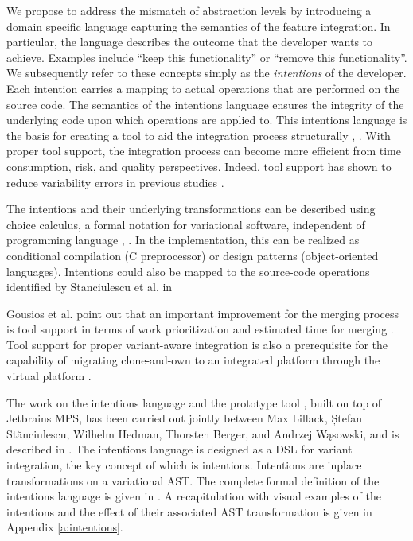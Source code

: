 We propose to address the mismatch of abstraction levels by introducing a domain specific language capturing the semantics of the feature integration. In particular, the language describes the outcome that the developer wants to achieve. Examples include ``keep this functionality'' or ``remove this functionality''. We subsequently refer to these concepts simply as the \textit{intentions} of the developer. Each intention carries a mapping to actual operations that are performed on the source code. The semantics of the intentions language ensures the integrity of the underlying code upon which operations are applied to. This intentions language is the basis for creating a tool to aid the integration process structurally \cite{mens2002}, \cite{apel2011}. With proper tool support, the integration process can become more efficient from time consumption, risk, and quality perspectives. Indeed, tool support has shown to reduce variability errors in previous studies \cite{ribeiro2014emergent}.

The intentions and their underlying transformations can be described using choice calculus, a formal notation for variational software, independent of programming language \cite{erwig2011choice}, \cite{walkingshaw2012choice}. In the implementation, this can be realized as conditional compilation (C preprocessor) or design patterns (object-oriented languages). Intentions could also be mapped to the source-code operations identified by Stanciulescu et al. in \cite{stanciulescu2016concepts}

Gousios et al. point out that an important improvement for the merging process is tool support in terms of work prioritization and estimated time for merging \cite{gousios2015}. Tool support for proper variant-aware integration is also a prerequisite for the capability of migrating clone-and-own to an integrated platform through the virtual platform \cite{antkiewicz2014flexible}.

The work on the intentions language and the prototype tool \tooln, built on top of Jetbrains MPS, has been carried out jointly between Max Lillack, Ștefan St\u{a}nciulescu, Wilhelm Hedman, Thorsten Berger, and Andrzej W\k{a}sowski, and is described in \cite{lillack2017intentions}. The intentions language is designed as a DSL for variant integration, the key concept of which is intentions. Intentions are inplace transformations on a variational AST. The complete formal definition of the intentions language is given in \cite{lillack2017intentions}. A recapitulation with visual examples of the intentions and the effect of their associated AST transformation is given in Appendix \ref{a:intentions}.

